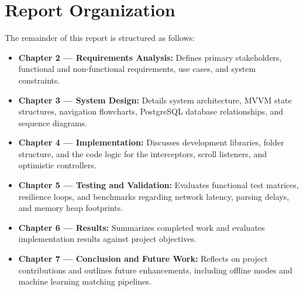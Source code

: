 \section{Report Organization}
The remainder of this report is structured as follows:
\begin{itemize}
    \item \textbf{Chapter 2 --- Requirements Analysis:} Defines primary stakeholders, functional and non-functional requirements, use cases, and system constraints.
    \item \textbf{Chapter 3 --- System Design:} Details system architecture, MVVM state structures, navigation flowcharts, PostgreSQL database relationships, and sequence diagrams.
    \item \textbf{Chapter 4 --- Implementation:} Discusses development libraries, folder structure, and the code logic for the interceptors, scroll listeners, and optimistic controllers.
    \item \textbf{Chapter 5 --- Testing and Validation:} Evaluates functional test matrices, resilience loops, and benchmarks regarding network latency, parsing delays, and memory heap footprints.
    \item \textbf{Chapter 6 --- Results:} Summarizes completed work and evaluates implementation results against project objectives.
    \item \textbf{Chapter 7 --- Conclusion and Future Work:} Reflects on project contributions and outlines future enhancements, including offline modes and machine learning matching pipelines.
\end{itemize}

